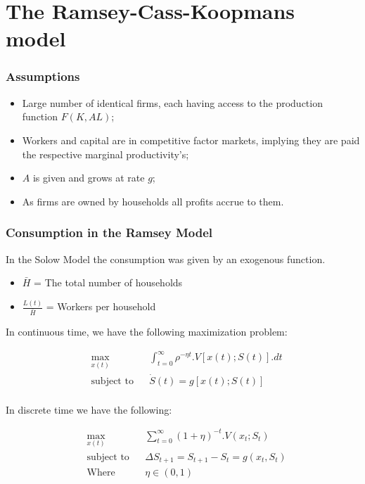  \section{The Ramsey-Cass-Koopmans model}\label{ramsey-model}
 
 \subsubsection{Assumptions}
\begin{itemize}
    \item Large number of identical firms, each having access to the production function $F(K,AL)$;
    \item Workers and capital are in competitive factor markets, implying they are paid the respective marginal productivity's;
    \item $A$ is given and grows at rate $g$;
    \item As firms are owned by households all profits accrue to them. 
\end{itemize}

\subsubsection{Consumption in the Ramsey Model}

In the Solow Model the consumption was given by an exogenous function. 

\begin{itemize}
    \item $ \bar{H}$ = The total number of households
    \item $ \frac{L(t)}{\bar{H}} $ = Workers per household
\end{itemize}
In continuous time, we have the following maximization problem: 

\begin{equation}
\begin{aligned}
& \underset{x(t)}{\max}
& & \int_{t=0}^{\infty} \rho ^{-\eta t}.V[x(t);S(t)].dt \\
& \text{subject to}
& & \dot{S}(t)= g\left[x(t);S(t)\right]\\
\label{tab:ramsey1}
\end{aligned}
\end{equation}

In discrete time we have the following: 

\begin{equation*}
\begin{aligned}
& \underset{x(t)}{\max}
& &   \sum_{t=0}^{\infty} (1+\eta)^{-t}.V(x_{t};S_{t}) \\
& \text{subject to} 
& & \Delta S_{t+1}=S_{t+1}-S_{t}=g(x_{t},S_{t}) \\ 
& \text{Where}
& & \eta \in (0,1)
\end{aligned}
\end{equation*}

